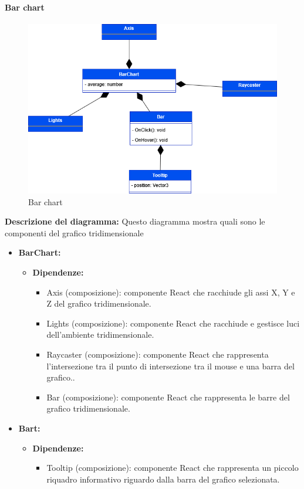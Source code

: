 \paragraph{Bar chart}
\begin{figure}[h!] \centering
    \includegraphics[scale=0.45]{template/images/uml_front/ui/barchart.png}
    \caption{Bar chart}
\end{figure}
\textbf{Descrizione del diagramma:}
Questo diagramma mostra quali sono le componenti del grafico tridimensionale
\begin{itemize}
    \item \textbf{BarChart:}
    \begin{itemize}
        \item \textbf{Dipendenze:}
        \begin{itemize}
            \item Axis (composizione): componente React che racchiude gli assi X, Y e Z del grafico tridimensionale.
            \item Lights (composizione): componente React che racchiude e gestisce luci dell'ambiente tridimensionale.
            \item Raycaster (composizione): componente React che rappresenta l'intersezione tra il punto di intersezione tra il mouse e una barra del grafico..
            \item Bar (composizione): componente React che rappresenta le barre del grafico tridimensionale.
        \end{itemize} 
    \end{itemize}

    \item \textbf{Bart:}
    \begin{itemize}
        \item \textbf{Dipendenze:}
        \begin{itemize}
            \item Tooltip (composizione): componente React che rappresenta un piccolo riquadro informativo riguardo dalla barra del grafico selezionata.
        \end{itemize} 
    \end{itemize}
\end{itemize}

